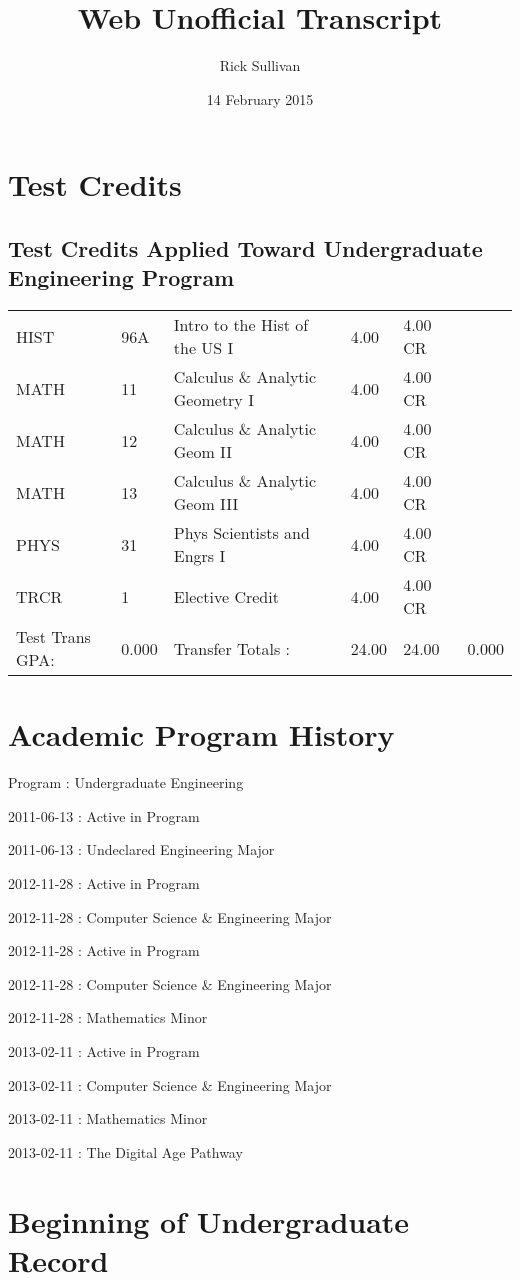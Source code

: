 \documentclass{article}\usepackage[T1]{fontenc}
\title{Web Unofficial Transcript}
\author{Rick Sullivan}
\date{14 February 2015}
\begin{document}
\maketitle

\section{Test Credits}
\subsection{Test Credits Applied Toward Undergraduate Engineering Program}
\begin{tabular}{ l  l  l  l  l  l }
HIST&96A&Intro to the Hist of the US I&4.00&4.00 CR&\\
MATH&11&Calculus \& Analytic Geometry I&4.00&4.00 CR&\\
MATH&12&Calculus \& Analytic Geom II&4.00&4.00 CR&\\
MATH&13&Calculus \& Analytic Geom III&4.00&4.00 CR&\\
PHYS&31&Phys Scientists and Engrs I&4.00&4.00 CR&\\
TRCR&1&Elective Credit&4.00&4.00 CR&\\
Test Trans GPA:&0.000&Transfer Totals :&24.00&24.00&0.000\\\end{tabular}
\section{Academic Program History}
Program	:	Undergraduate Engineering \

2011-06-13	:	Active in Program \

2011-06-13 : Undeclared Engineering Major \

2012-11-28	:	Active in Program \

2012-11-28 : Computer Science \& Engineering Major \

2012-11-28	:	Active in Program \

2012-11-28 : Computer Science \& Engineering Major \

2012-11-28 : Mathematics Minor \

2013-02-11	:	Active in Program \

2013-02-11 : Computer Science \& Engineering Major \

2013-02-11 : Mathematics Minor \

2013-02-11 : The Digital Age Pathway \

\section{Beginning of Undergraduate Record}
\end{document}
